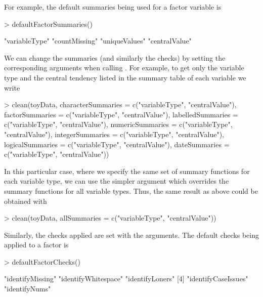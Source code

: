 \documentclass[article,shortnames]{jss}
\newcommand{\R}[1]{\code{#1}}
\begin{document}
For example, the default summaries being used for a factor variable is 
\begin{Schunk}
\begin{Sinput}
> defaultFactorSummaries()
\end{Sinput}
\begin{Soutput}
[1] "variableType" "countMissing" "uniqueValues" "centralValue"
\end{Soutput}
\end{Schunk} 

We can change the summaries (and similarly the checks) by setting the
corresponding arguments when calling \R{clean()}. For example, to get
only the variable type and the central tendency listed in the summary
table of each variable we write

\begin{Schunk}
\begin{Sinput}
> clean(toyData, characterSummaries = c("variableType", "centralValue"),
        factorSummaries = c("variableType", "centralValue"),
        labelledSummaries = c("variableType", "centralValue"),
        numericSummaries = c("variableType", "centralValue"),
        integerSummaries = c("variableType", "centralValue"),
        logicalSummaries = c("variableType", "centralValue"),
        dateSummaries = c("variableType", "centralValue"))
\end{Sinput}
\end{Schunk}

In this particular case, where we specify the same set of summary
functions for each variable type, we can use the simpler argument
\R{allSummaries} which overrides the summary functions for all
variable types. Thus, the same result as above could be obtained with

\begin{Schunk}
\begin{Sinput}
> clean(toyData, allSummaries = c("variableType", "centralValue"))
\end{Sinput}
\end{Schunk}

Similarly, the checks applied are set with the \R{XXXChecks}
arguments. The default checks being applied to a factor is 

\begin{Schunk}
\begin{Sinput}
> defaultFactorChecks()
\end{Sinput}
\begin{Soutput}
[1] "identifyMissing"    "identifyWhitespace" "identifyLoners"    
[4] "identifyCaseIssues" "identifyNums" 
\end{Soutput}
\end{Schunk} 
\end{document}
